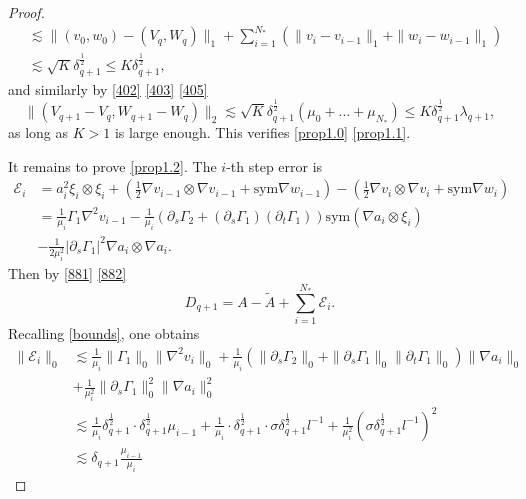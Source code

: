 \documentclass[reqno,12pt]{amsart}
\numberwithin{equation}{section}
\theoremstyle{plain}
\theoremstyle{definition}
\newcommand{\E}{\mathcal{E}}
\newcommand{\sym}{\text{sym}}
\begin{document}
\begin{proof}
\begin{equation}
\begin{aligned}
    &\lesssim \|(v_0,w_0)-(V_q,W_q)\|_1+\sum_{i=1}^{N_*}(\|v_i-v_{i-1}\|_1+\|w_i-w_{i-1}\|_1)\\
    &\lesssim\sqrt{K}\delta_{q+1}^\frac{1}{2}
    \le K\delta_{q+1}^\frac{1}{2},
\end{aligned}
\end{equation}
and similarly by \eqref{402} \eqref{403} \eqref{405}
\begin{equation}\label{K2}
    \|(V_{q+1}-V_q, W_{q+1}-W_q)\|_2\lesssim \sqrt{K}\delta_{q+1}^\frac{1}{2}(\mu_0+...+\mu_{N_*})
    \le K\delta_{q+1}^\frac{1}{2}\lambda_{q+1},
\end{equation}
as long as $K>1$ is large enough. This verifies \eqref{prop1.0} \eqref{prop1.1}. 

It remains to prove \eqref{prop1.2}. The $i$-th step error is
\begin{align*}
    {\E}_i
    &={a}_i^2 \xi_i\otimes \xi_i
    +(\frac{1}{2}\nabla  {v}_{i-1}\otimes\nabla  {v}_{i-1}+\sym\nabla   {w}_{i-1})
    -(\frac{1}{2}\nabla  {v}_i\otimes\nabla  {v}_i+\sym\nabla   {w}_i)\\
    & =\frac{1}{ {\mu}_i}\Gamma_1\nabla^2  {v}_{i-1}
    -\frac{1}{ {\mu}_i}(\partial_{s}\Gamma_2+(\partial_{s}\Gamma_1)(\partial_{t}\Gamma_1))\sym(\nabla {a}_i\otimes \xi_i)\\
    & -\frac{1}{2 {\mu}_i^2}|\partial_{s}\Gamma_1|^2\nabla {a}_i\otimes\nabla {a}_i.
\end{align*}
Then by \eqref{881} \eqref{882}
\begin{equation}
    D_{q+1}=A-\tilde A+\sum_{i=1}^{N_*}\E_i.
\end{equation}
Recalling \eqref{bounds}, one obtains
\begin{equation}
\begin{aligned}
    \|\E_i\|_0
    &\lesssim\frac{1}{\mu_i}\|\Gamma_1\|_0\|\nabla^2 v_i\|_0 +\frac{1}{\mu_i}(\|\partial_s\Gamma_2\|_0+\|\partial_s\Gamma_1\|_0\|\partial_t\Gamma_1\|_0)\|\nabla a_i\|_0\\
    &+\frac{1}{\mu_i^2}\|\partial_s\Gamma_1\|_0^2\|\nabla a_i\|_0^2\\
    &\lesssim\frac{1}{\mu_i}\delta_{q+1}^\frac{1}{2}\cdot \delta_{q+1}^\frac{1}{2}\mu_{i-1}
    + \frac{1}{\mu_i}\cdot\delta_{q+1}^\frac{1}{2}\cdot\sigma\delta_{q+1}^\frac{1}{2}l^{-1}
    +\frac{1}{\mu_i^2}(\sigma\delta_{q+1}^\frac{1}{2}l^{-1})^2\\
    &\lesssim \delta_{q+1}\frac{\mu_{i-1}}{\mu_i}
\end{aligned}
\end{equation}

\end{proof}
\end{document}
